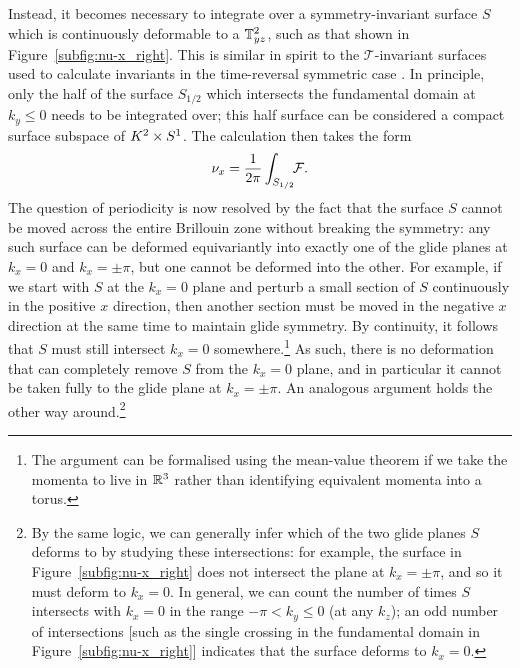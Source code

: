 Instead, it becomes necessary to integrate over a symmetry-invariant surface $S$ which is continuously deformable to a $\mathbb{T}_{yz}^2$, such as that shown in Figure~\ref{subfig:nu-x_right}. This is similar in spirit to the $\mathcal{T}$-invariant surfaces used to calculate invariants in the time-reversal symmetric case \cite{Thiang_equivariant}. In principle, only the half of the surface $S_{1/2}$ which intersects the fundamental domain at $k_y\leq 0$ needs to be integrated over; this half surface can be considered a compact surface subspace of $K^2\times S^1$. The calculation then takes the form
\begin{equation}\label{eq:z-invariant2}
	\nu_x = \frac{1}{2\pi}\int_{S_{1/2}}\!\!\mathcal{F}.
\end{equation}
The question of periodicity is now resolved by the fact that the surface $S$ cannot be moved across the entire Brillouin zone without breaking the symmetry: any such surface can be deformed equivariantly into exactly one of the glide planes at $k_x=0$ and $k_x=\pm\pi$, but one cannot be deformed into the other. For example, if we start with $S$ at the $k_x=0$ plane and perturb a small section of $S$ continuously in the positive $x$ direction, then another section must be moved in the negative $x$ direction at the same time to maintain glide symmetry. By continuity, it follows that $S$ must still intersect $k_x=0$ somewhere.\footnote{
	The argument can be formalised using the mean-value theorem if we take the momenta to live in $\mathbb{R}^3$ rather than identifying equivalent momenta into a torus.}
As such, there is no deformation that can completely remove $S$ from the $k_x=0$ plane, and in particular it cannot be taken fully to the glide plane at $k_x=\pm\pi$. An analogous argument holds the other way around.\footnote{
	By the same logic, we can generally infer which of the two glide planes $S$ deforms to by studying these intersections: for example, the surface in Figure~\ref{subfig:nu-x_right} does not intersect the plane at $k_x=\pm\pi$, and so it must deform to $k_x=0$. In general, we can count the number of times $S$ intersects with $k_x=0$ in the range $-\pi<k_y\leq 0$ (at any $k_z$); an odd number of intersections [such as the single crossing in the fundamental domain in Figure~\ref{subfig:nu-x_right}] indicates that the surface deforms to $k_x=0$.}


